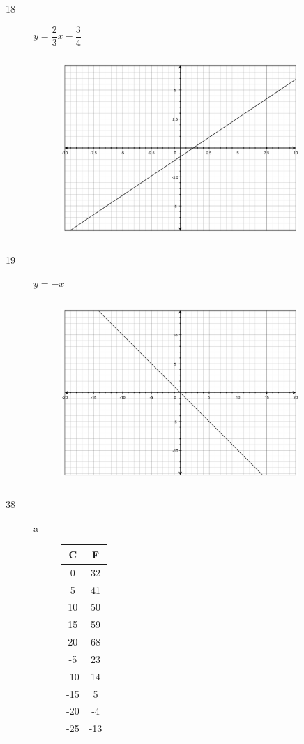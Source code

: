 \documentclass[fleqn,addpoints]{exam}
\begin{document}
\begin{description}
\item[18]
$y= \dfrac{2}{3} x - \dfrac{3}{4}$
\begin{figure}[H]
  \includegraphics[width=9cm,height=7cm]{p356/18}
\end{figure}

\item[19]
$y=-x$
\begin{figure}[H]
  \includegraphics[width=9cm,height=7cm]{p356/19}
\end{figure}

\item[38]
\begin{description}
\item[a]
\begin{tabular}{| c | c |}
\hline
  C & F \\
\hline
\hline
  0 & 32 \\
  5 & 41 \\
  10 & 50 \\
  15 & 59 \\
  20 & 68 \\
  -5 & 23 \\
  -10 & 14 \\
  -15 & 5 \\
  -20 & -4 \\
  -25 & -13 \\
\hline
\end{tabular}


\end{description}
\end{description}
\end{document}
